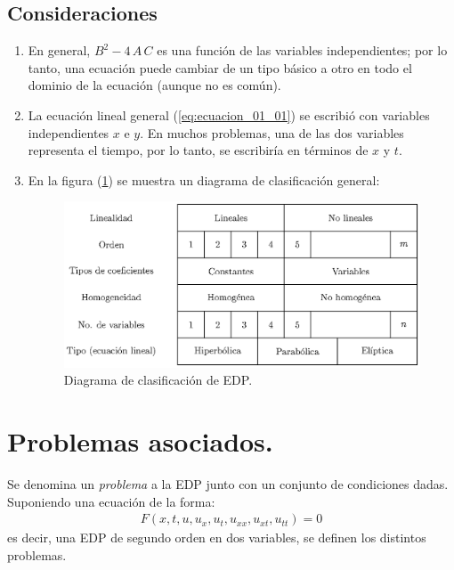 \subsection*{Consideraciones}
\begin{enumerate}
\item En general, $B^{2} - 4 \, A \, C$ es una función de las variables independientes; por lo tanto, una ecuación puede cambiar de un tipo básico a otro en todo el dominio de la ecuación (aunque no es común).
\item La ecuación lineal general (\ref{eq:ecuacion_01_01}) se escribió con variables independientes $x$ e $y$. En muchos problemas, una de las dos variables representa el tiempo, por lo tanto, se escribiría en términos de $x$ y $t$.
\item En la figura (\ref{fig:figura_clasificacion_EDP}) se muestra un diagrama de clasificación general:
\begin{figure}[H]
    \centering
    \includegraphics[scale=1.1]{Imagenes/Cuadro_Clasificacion_EDP.eps}
    \caption{Diagrama de clasificación de EDP.}
    \label{fig:figura_clasificacion_EDP}
\end{figure}
\end{enumerate}

\section{Problemas asociados.}

Se denomina un \emph{problema} a la EDP junto con un conjunto de condiciones dadas. Suponiendo una ecuación de la forma:
\begin{align}
F(x, t, u, u_{x}, u_{t}, u_{xx}, u_{xt}, u_{tt}) = 0
\label{eq:ecuacion_Z01_06}
\end{align}
es decir, una EDP de segundo orden en dos variables, se definen los distintos problemas.

